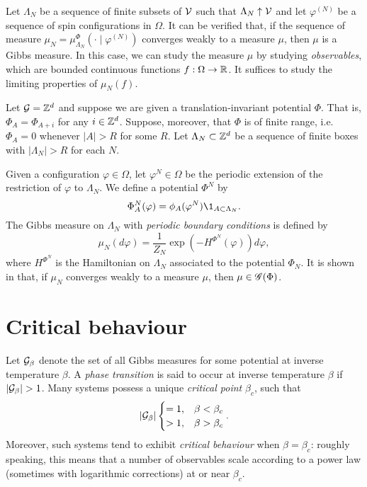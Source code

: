 Let $\Lambda_N$ be a sequence of finite subsets of $\mathcal{V}$ such that $\Lambda_N \uparrow \mathcal{V}$
and let $\varphi^{(N)}$ be a sequence of spin configurations in $\Omega$. It can be verified
that, if the sequence of measure $\mu_N = \mu^\Phi_{\Lambda_N}(\cdot \mid \varphi^{(N)})$ converges weakly
to a measure $\mu$, then $\mu$ is a Gibbs measure. In this case, we can study the measure $\mu$
by studying \emph{observables}, which are bounded continuous functions $f : \Omega \rightarrow {\mathbb R}$. It suffices
to study the limiting properties of $\mu_N(f)$.

\begin{example}
Let $\mathcal{G} = { {{\mathbb Z}}^d }$ and suppose we are given a translation-invariant potential $\Phi$.
That is, $\Phi_A = \Phi_{A + i}$ for any $i \in { {{\mathbb Z}}^d }$.
Suppose, moreover, that $\Phi$ is of finite range, i.e.\ $\Phi_A = 0$ whenever
$|A| > R$ for some $R$. Let $\Lambda_N \subset { {{\mathbb Z}}^d }$ be a sequence of finite boxes
with $|\Lambda_N| > R$ for each $N$.

Given a configuration $\varphi \in \Omega$, let $\varphi^N \in \Omega$
be the periodic extension of the restriction of $\varphi$ to $\Lambda_N$.
We define a potential $\Phi^N$ by
\begin{equation}
\Phi^N_A(\varphi) = \phi_A(\varphi^N) \1_{A \subset \Lambda_N}.
\end{equation}
The Gibbs measure on $\Lambda_N$ with \emph{periodic boundary conditions} is defined by
\begin{equation}
\mu_N(d\varphi) = \frac{1}{Z_N} \exp\left(-H^{\Phi^N}(\varphi)\right) d\varphi,
\end{equation}
where $H^{\Phi^N}$ is the Hamiltonian on $\Lambda_N$ associated to the potential $\Phi_N$.
It is shown in \cite[Example 4.20]{Georgii11} that, if $\mu_N$ converges weakly to a
measure $\mu$, then $\mu \in \mathscr{G}(\Phi)$.
\end{example}



\section{Critical behaviour}

Let $\mathcal{G}_\beta$ denote the set of all Gibbs measures for some potential at inverse temperature
$\beta$. A \emph{phase transition} is said to occur at inverse temperature $\beta$ if
$|\mathcal{G}_\beta| > 1$. Many systems possess a unique \emph{critical point} $\beta_c$, such that
\begin{equation}
|\mathcal{G}_\beta|
\begin{cases}
=1,  & \beta < \beta_c \\
> 1, & \beta > \beta_c
\end{cases}.
\end{equation}
Moreover, such systems tend to exhibit \emph{critical behaviour} when $\beta = \beta_c$:
roughly speaking, this means that a number of observables scale according to a power
law (sometimes with logarithmic corrections) at or near $\beta_c$.

